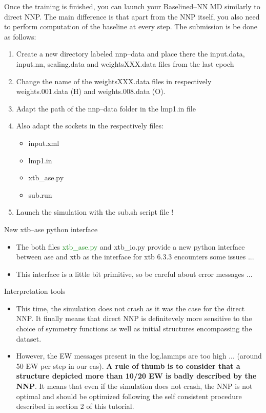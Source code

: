 \documentclass[12pt]{article}
\begin{document}
Once the training is finished, you can launch your Baselined--NN MD similarly to direct NNP. The main difference is that apart from the NNP itself, you also need to perform computation of the baseline at every step. The submission is  be done as follows: 
\begin{enumerate}
    \item Create a new directory labeled nnp--data and place there the input.data, input.nn, scaling.data and weightsXXX.data files from the last epoch
    \item Change the name of the weightsXXX.data files in respectively weights.001.data (H) and weights.008.data (O).
    \item Adapt the path of the nnp--data folder in the lmp1.in file
    \item Also adapt the sockets in the respectively files:
    \begin{itemize}
        \item input.xml
        \item lmp1.in
        \item xtb\_ase.py
        \item sub.run
    \end{itemize}
    \item Launch the simulation with the sub.sh script file !
\end{enumerate}

\begin{mybox1}{New xtb--ase python interface}
\begin{itemize}
    \item The both files \textcolor{green}{xtb\_ase.py} and xtb\_io.py provide a new python interface between ase and xtb as the interface for xtb 6.3.3 encounters some issues ...
    \item This interface is a little bit primitive, so be careful about error messages ...
\end{itemize}
\end{mybox1}

\begin{mybox1}{Interpretation tools}
\begin{itemize}
    \item This time, the simulation does not crash as it was the case for the direct NNP. It finally means that direct NNP is definitevely more sensitive to the choice of symmetry functions as well as initial structures encompassing the dataset. 
    \item However, the EW messages present in the log.lammps are too high ... (around 50 EW per step in our cas). \textbf{A rule of thumb is to consider that a structure depicted more than 10/20 EW is badly described by the NNP}. It means that even if the simulation does not crash, the NNP is not optimal and should be optimized following the self consistent procedure described in section 2 of this tutorial.
\end{itemize}
\end{mybox1}
%
\end{document}

